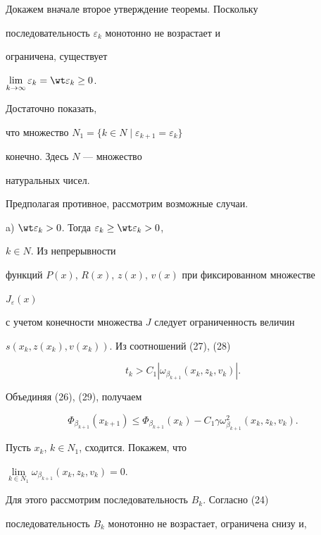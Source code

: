 \begin{pf} Докажем вначале второе утверждение теоремы. Поскольку 


последовательность $\varepsilon_k$ монотонно не возрастает и 


ограничена, существует 


$\lim\limits_{k\to\infty}\varepsilon_k=\wt\varepsilon_k\ge 0$. 


Достаточно показать, 


что множество $N_1=\{k\in N\mid\varepsilon_{k+1}=\varepsilon_k\}$ 


конечно. Здесь $N$ --- множество 


натуральных чисел. 


 


Предполагая противное, рассмотрим возможные случаи. 


 


a) $\wt\varepsilon_k>0$. Тогда $\varepsilon_k\ge\wt\varepsilon_k>0$, 


$k\in N$. Из непрерывности 


функций $P(x)$, $R(x)$, $z(x)$, $v(x)$ при фиксированном множестве 


$J_\varepsilon(x)$ 


с учетом конечности множества $J$ следует ограниченность величин 


$s(x_k,z(x_k),v(x_k))$. Из соотношений (27), (28) 


\begin{equation} 


t_k>C_1|\omega_{\beta_{k+1}}(x_k,z_k,v_k)|. 


\end{equation} 


Объединяя (26), (29), получаем 


\begin{equation} 


\Phi_{\beta_{k+1}}(x_{k+1})\le\Phi_{\beta_{k+1}}(x_k)- 


C_1\gamma\omega^2_{\beta_{k+1}}(x_k,z_k,v_k). 


\end{equation} 


Пусть $x_k$, $k\in N_1$, сходится. Покажем, что 


$\lim\limits_{k\in{}N_1}\omega_{\beta_{k+1}}(x_k,z_k,v_k)=0$. 


Для этого рассмотрим последовательность $B_k$. Согласно (24) 


последовательность $B_k$ монотонно не возрастает, ограничена снизу и, 



\end{pf}
